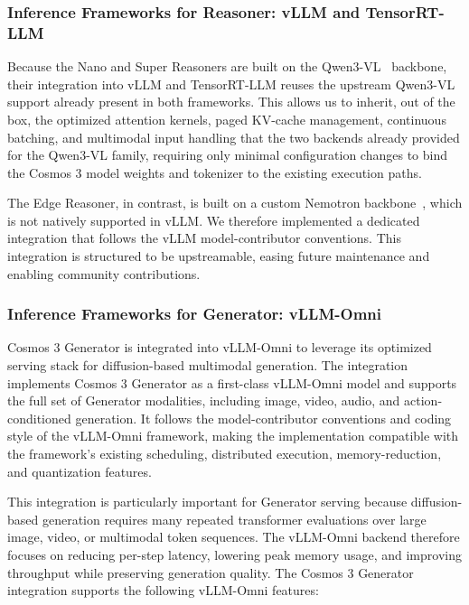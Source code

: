 \documentclass{llmxive}
\begin{document}
\subsubsection{Inference Frameworks for Reasoner: vLLM and TensorRT-LLM}

Because the Nano and Super Reasoners are built on the Qwen3-VL~\citep{qwen3vl2025} backbone, their integration into vLLM and TensorRT-LLM reuses the upstream Qwen3-VL support already present in both frameworks. This allows us to inherit, out of the box, the optimized attention kernels, paged KV-cache management, continuous batching, and multimodal input handling that the two backends already provided for the Qwen3-VL family, requiring only minimal configuration changes to bind the Cosmos 3 model weights and tokenizer to the existing execution paths.

The Edge Reasoner, in contrast, is built on a custom Nemotron backbone~\citep{nemotron3-family}, which is not natively supported in vLLM. We therefore implemented a dedicated integration that follows the vLLM model-contributor conventions. This integration is structured to be upstreamable, easing future maintenance and enabling community contributions.

\subsubsection{Inference Frameworks for Generator: vLLM-Omni}

Cosmos 3 Generator is integrated into vLLM-Omni to leverage its optimized serving stack for diffusion-based multimodal generation. The integration implements Cosmos 3 Generator as a first-class vLLM-Omni model and supports the full set of Generator modalities, including image, video, audio, and action-conditioned generation. It follows the model-contributor conventions and coding style of the vLLM-Omni framework, making the implementation compatible with the framework's existing scheduling, distributed execution, memory-reduction, and quantization features. 

This integration is particularly important for Generator serving because diffusion-based generation requires many repeated transformer evaluations over large image, video, or multimodal token sequences. The vLLM-Omni backend therefore focuses on reducing per-step latency, lowering peak memory usage, and improving throughput while preserving generation quality. The Cosmos 3 Generator integration supports the following vLLM-Omni features:
\end{document}
